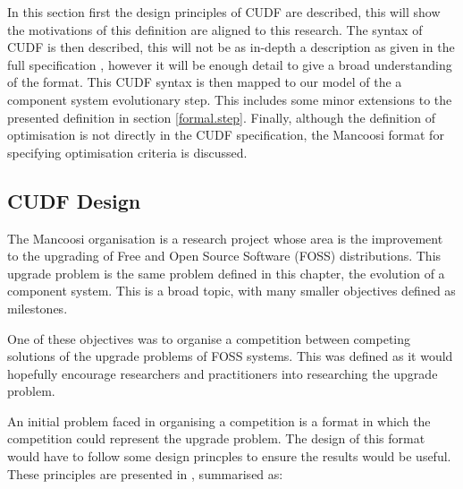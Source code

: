 In this section first the design principles of CUDF are described, this will show the motivations of this definition are aligned to this research.
The syntax of CUDF is then described, this will not be as in-depth a description as given in the full specification \cite{treinen2009common},
however it will be enough detail to give a broad understanding of the format.
This CUDF syntax is then mapped to our model of the a component system evolutionary step.
This includes some minor extensions to the presented definition in section \ref{formal.step}.
Finally, although the definition of optimisation is not directly in the CUDF specification, the Mancoosi format for specifying optimisation criteria is discussed.

\subsection{CUDF Design}
The Mancoosi organisation is a research project whose area is the improvement to the upgrading of Free and Open Source Software (FOSS) distributions.
This upgrade problem is the same problem defined in this chapter, the evolution of a component system.
This is a broad topic, with many smaller objectives defined as milestones.

One of these objectives was to organise a competition between competing solutions of the upgrade problems of FOSS systems.
This was defined as it would hopefully encourage researchers and practitioners into researching the upgrade problem.

An initial problem faced in organising a competition is a format in which the competition could represent the upgrade problem.
The design of this format would have to follow some design princples to ensure the results would be useful.
These principles are presented in \cite{treinen2009common}, summarised as:

